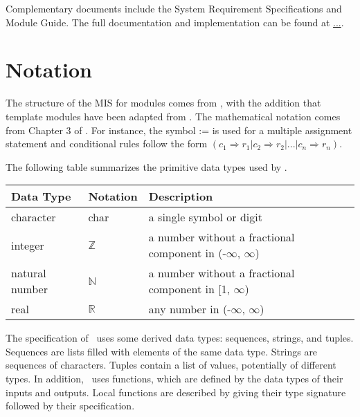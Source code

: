 \documentclass[12pt, titlepage]{article}
\begin{document}
Complementary documents include the System Requirement Specifications
and Module Guide.  The full documentation and implementation can be
found at \url{...}.  

\section{Notation}


The structure of the MIS for modules comes from \citet{HoffmanAndStrooper1995},
with the addition that template modules have been adapted from
\cite{GhezziEtAl2003}.  The mathematical notation comes from Chapter 3 of
\citet{HoffmanAndStrooper1995}.  For instance, the symbol := is used for a
multiple assignment statement and conditional rules follow the form $(c_1
\Rightarrow r_1 | c_2 \Rightarrow r_2 | ... | c_n \Rightarrow r_n )$.

The following table summarizes the primitive data types used by \progname. 

\begin{center}
\renewcommand{\arraystretch}{1.2}
\noindent 
\begin{tabular}{l l p{7.5cm}} 
\toprule 
\textbf{Data Type} & \textbf{Notation} & \textbf{Description}\\ 
\midrule
character & char & a single symbol or digit\\
integer & $\mathbb{Z}$ & a number without a fractional component in (-$\infty$, $\infty$) \\
natural number & $\mathbb{N}$ & a number without a fractional component in [1, $\infty$) \\
real & $\mathbb{R}$ & any number in (-$\infty$, $\infty$)\\
\bottomrule
\end{tabular} 
\end{center}

\noindent
The specification of \progname \ uses some derived data types: sequences, strings, and
tuples. Sequences are lists filled with elements of the same data type. Strings
are sequences of characters. Tuples contain a list of values, potentially of
different types. In addition, \progname \ uses functions, which
are defined by the data types of their inputs and outputs. Local functions are
described by giving their type signature followed by their specification.
\end{document}
